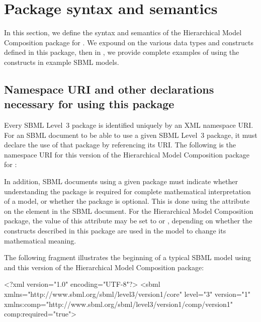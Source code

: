 
\newcommand{\fixttspace}{\hspace*{1pt}}

\section{Package syntax and semantics}
\label{sec:syntax}

In this section, we define the syntax and semantics of the Hierarchical
Model Composition package for \sbmlthree.  We expound on the
various data types and constructs defined in this package, then in
, we provide complete examples of using the constructs in
example SBML models.

\subsection{Namespace URI and other declarations necessary for using this package}
\label{xml-namespace}

Every SBML Level~3 package is identified uniquely by an XML namespace
URI.  For an SBML document to be able to use a given SBML Level~3
package, it must declare the use of that package by referencing its URI.
The following is the namespace URI for this version of the Hierarchical
Model Composition package for \sbmlthree:
\begin{center}
\end{center}

In addition, SBML documents using a given package must indicate whether
understanding the package is required for complete mathematical
interpretation of a model, or whether the package is optional.  This is
done using the attribute  on the  element
in the SBML document.  For the Hierarchical Model Composition package,
the value of this attribute may be set to  or ,
depending on whether the constructs described in this package are used
in the model to change its mathematical meaning.

The following fragment illustrates the beginning of a typical SBML model
using \sbmlthreecore and this version of the Hierarchical Model
Composition package:

\begin{example}
<?xml version="1.0" encoding="UTF-8"?>
<sbml xmlns="http://www.sbml.org/sbml/level3/version1/core" level="3" version="1"
      xmlns:comp="http://www.sbml.org/sbml/level3/version1/comp/version1" comp:required="true">
\end{example}
    

